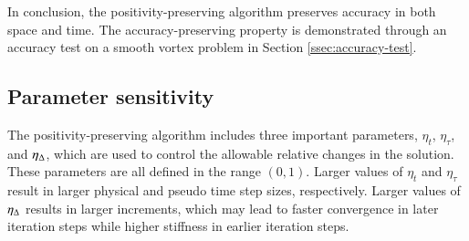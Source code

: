 In conclusion, the positivity-preserving algorithm preserves accuracy in both space and time. The accuracy-preserving property is demonstrated through an accuracy test on a smooth vortex problem in Section \ref{ssec:accuracy-test}.

\subsection{Parameter sensitivity}
\label{ssec:influence-parameters}

The positivity-preserving algorithm includes three important parameters, $\eta_t$, $\eta_{\tau}$, and $\eta_{\mathrm\Delta}$, which are used to control the allowable relative changes in the solution. These parameters are all defined in the range $(0,1)$. Larger values of $\eta_t$ and $\eta_{\tau}$ result in larger physical and pseudo time step sizes, respectively. Larger values of $\eta_{\mathrm\Delta}$ results in larger increments, which may lead to faster convergence in later iteration steps while higher stiffness in earlier iteration steps. 

